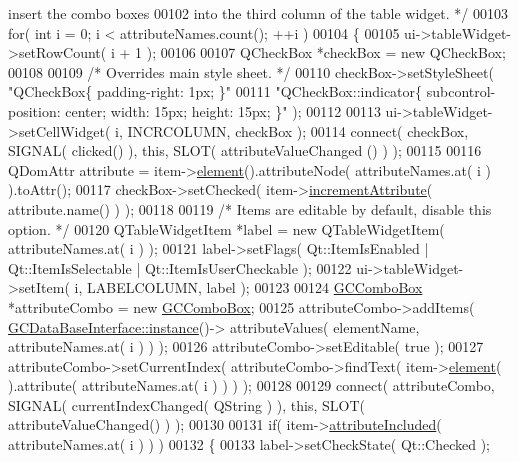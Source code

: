 \begin{DoxyCode}
{       insert the combo boxes}
00102 \textcolor{comment}{    into the third column of the table widget. */}
00103     \textcolor{keywordflow}{for}( \textcolor{keywordtype}{int} i = 0; i < attributeNames.count(); ++i )
00104     \{
00105       ui->tableWidget->setRowCount( i + 1 );
00106 
00107       QCheckBox *checkBox = \textcolor{keyword}{new} QCheckBox;
00108 
00109       \textcolor{comment}{/* Overrides main style sheet. */}
00110       checkBox->setStyleSheet( \textcolor{stringliteral}{"QCheckBox\{ padding-right: 1px; \}"}
00111                                \textcolor{stringliteral}{"QCheckBox::indicator\{ subcontrol-position:
       center; width: 15px; height: 15px; \}"} );
00112 
00113       ui->tableWidget->setCellWidget( i, INCRCOLUMN, checkBox );
00114       connect( checkBox, SIGNAL( clicked() ), \textcolor{keyword}{this}, SLOT( attributeValueChanged
      () ) );
00115 
00116       QDomAttr attribute = item->\hyperlink{class_g_c_tree_widget_item_a584cad866bdbd94710d31eb77b804d84}{element}().attributeNode( attributeNames.at( i 
      ) ).toAttr();
00117       checkBox->setChecked( item->\hyperlink{class_g_c_tree_widget_item_af0b5f0f5449f402c90e5ab7ff74acc77}{incrementAttribute}( attribute.name() ) );
00118 
00119       \textcolor{comment}{/* Items are editable by default, disable this option. */}
00120       QTableWidgetItem *label = \textcolor{keyword}{new} QTableWidgetItem( attributeNames.at( i ) );
00121       label->setFlags( Qt::ItemIsEnabled | Qt::ItemIsSelectable | 
      Qt::ItemIsUserCheckable );
00122       ui->tableWidget->setItem( i, LABELCOLUMN, label );
00123 
00124       \hyperlink{class_g_c_combo_box}{GCComboBox} *attributeCombo = \textcolor{keyword}{new} \hyperlink{class_g_c_combo_box}{GCComboBox};
00125       attributeCombo->addItems( \hyperlink{class_g_c_data_base_interface_a1baea9c0667aa8b610ec30076fcab84c}{GCDataBaseInterface::instance}()->
      attributeValues( elementName, attributeNames.at( i ) ) );
00126       attributeCombo->setEditable( \textcolor{keyword}{true} );
00127       attributeCombo->setCurrentIndex( attributeCombo->findText( item->\hyperlink{class_g_c_tree_widget_item_a584cad866bdbd94710d31eb77b804d84}{element}(
      ).attribute( attributeNames.at( i ) ) ) );
00128 
00129       connect( attributeCombo, SIGNAL( currentIndexChanged( QString ) ), \textcolor{keyword}{this}, 
      SLOT( attributeValueChanged() ) );
00130 
00131       \textcolor{keywordflow}{if}( item->\hyperlink{class_g_c_tree_widget_item_a91d71330acb400242d45b6d74c7e0f87}{attributeIncluded}( attributeNames.at( i ) ) )
00132       \{
00133         label->setCheckState( Qt::Checked );

\end{DoxyCode}
